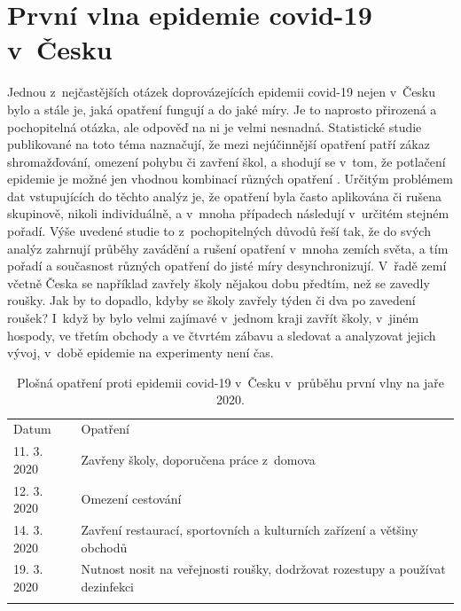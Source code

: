 \section*{První vlna epidemie covid-19 v~Česku}

Jednou z~nejčastějších otázek doprovázejících epidemii covid-19 nejen v~Česku bylo a stále je, jaká opatření fungují a do jaké míry. Je to naprosto přirozená a pochopitelná otázka, ale odpověď na ni je velmi nesnadná. Statistické studie publikované na toto téma naznačují, že mezi nejúčinnější opatření patří zákaz shromažďování, omezení pohybu či zavření škol, a shodují se v~tom, že potlačení epidemie je možné jen vhodnou kombinací různých opatření \cite{Flaxman_etal2020,Li_etal2020,Haug_etal2020,Liu_etal2021}. Určitým problémem dat vstupujících do těchto analýz je, že opatření byla často aplikována či rušena skupinově, nikoli individuálně, a v~mnoha případech následují v~určitém stejném pořadí. Výše uvedené studie to z~pochopitelných důvodů řeší tak, že do svých analýz zahrnují průběhy zavádění a rušení opatření v~mnoha zemích světa, a tím pořadí a současnost různých opatření do jisté míry desynchronizují. V~řadě zemí včetně Česka se například zavřely školy nějakou dobu předtím, než se zavedly roušky. Jak by to dopadlo, kdyby se školy zavřely týden či dva po zavedení roušek? I~když by bylo velmi zajímavé v~jednom kraji zavřít školy, v~jiném hospody, ve třetím obchody a ve čtvrtém zábavu a sledovat a analyzovat jejich vývoj, v~době epidemie na experimenty není čas.

\begin{table}[h]
	\begin{center}
	\begin{tabular}{lp{8cm}}
		\hline\noalign{\smallskip}
		Datum & Opatření \\
		\noalign{\smallskip}\hline\noalign{\smallskip}
		11. 3. 2020 & Zavřeny školy, doporučena práce z~domova \\
		12. 3. 2020 & Omezení cestování \\
		14. 3. 2020 & Zavření restaurací, sportovních a kulturních zařízení a většiny obchodů \\ 
		19. 3. 2020 & Nutnost nosit na veřejnosti roušky, dodržovat rozestupy a používat dezinfekci \\
		\noalign{\smallskip}\hline
	\end{tabular}
	\end{center}
	\caption{Plošná opatření proti epidemii covid-19 v~Česku v~průběhu první vlny na jaře 2020.}
	\label{table:interventions}
\end{table}

